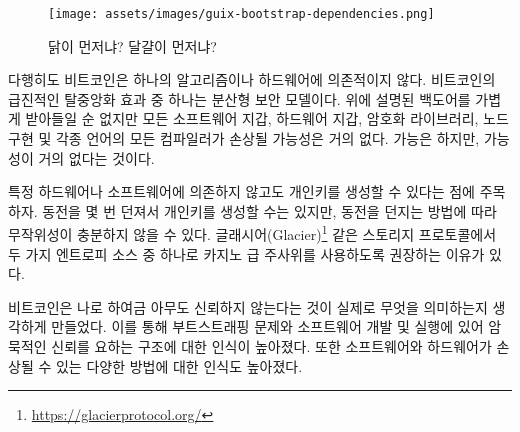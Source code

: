 \begin{figure}
	\texttt{[image: assets/images/guix-bootstrap-dependencies.png]}
	\caption{닭이 먼저냐? 달걀이 먼저냐?}
	\label{fig:guix-bootstrap-dependencies}
\end{figure}

\begin{comment}
	Luckily, Bitcoin doesn't rely on a single algorithm or piece of
	hardware. One effect of Bitcoin's radical decentralization is a
	distributed security model. Although the backdoors described above are
	not to be taken lightly, it is unlikely that every software wallet,
	every hardware wallet, every cryptographic library, every node
	implementation, and every compiler of every language is compromised.
	Possible, but highly unlikely.
\end{comment}
다행히도 비트코인은 하나의 알고리즘이나 하드웨어에 의존적이지 않다.
비트코인의 급진적인 탈중앙화 효과 중 하나는 분산형 보안 모델이다. 
위에 설명된 백도어를 가볍게 받아들일 순 없지만 모든 소프트웨어 지갑, 하드웨어 지갑, 암호화 라이브러리, 노드 구현 및 각종 언어의 모든 컴파일러가 손상될 가능성은 거의 없다.
가능은 하지만, 가능성이 거의 없다는 것이다.

\begin{comment}
	Note that you can generate a private key without relying on any computational
	hardware or software. You can flip a coin~\cite{antonopoulos2014mastering} a
	couple of times, although depending on your coin and tossing style this source
	of randomness might not be sufficiently random. There is a reason why storage
	protocols like Glacier\footnote{\url{https://glacierprotocol.org/}} advise to
	use casino-grade dice as one of two sources of entropy.
\end{comment}
특정 하드웨어나 소프트웨어에 의존하지 않고도 개인키를 생성할 수 있다는 점에 주목하자.
동전을 몇 번 던져서 개인키를 생성할 수는 있지만\cite{antonopoulos2014mastering}, 동전을 던지는 방법에 따라 무작위성이 충분하지 않을 수 있다.
글래시어(Glacier)\footnote{\url{https://glacierprotocol.org/}} 같은 스토리지 프로토콜에서
두 가지 엔트로피 소스 중 하나로 카지노 급 주사위를 사용하도록 권장하는 이유가 있다.

\begin{comment}
	Bitcoin forced me to reflect on what trusting nobody actually entails.
	It raised my awareness of the bootstrapping problem, and the implicit
	chain-of-trust in developing and running software. It also raised my
	awareness of the many ways in which software and hardware can be
	compromised
\end{comment}
비트코인은 나로 하여금 아무도 신뢰하지 않는다는 것이 실제로 무엇을 의미하는지 생각하게 만들었다. 
이를 통해 부트스트래핑 문제와 소프트웨어 개발 및 실행에 있어 암묵적인 신뢰를 요하는 구조에 대한 인식이 높아졌다.
또한 소프트웨어와 하드웨어가 손상될 수 있는 다양한 방법에 대한 인식도 높아졌다.

